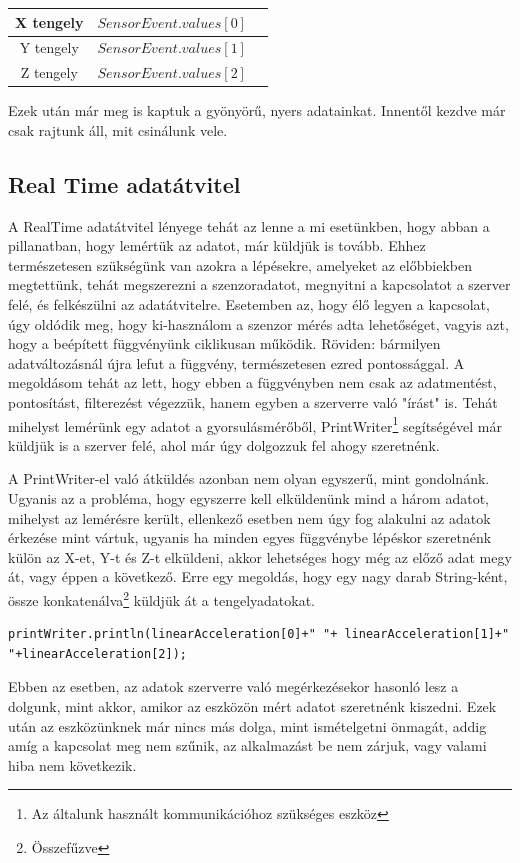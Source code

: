 \documentclass{thesis-ekf}
\theoremstyle{definition}
\theoremstyle{remark}
\begin{document}
\begin{center}
	\begin{tabular}{ |c|c|c| } 
		\hline
		X tengely & $SensorEvent.values[0]$  \\
		\hline
		Y tengely & $SensorEvent.values[1]$\\
		\hline
		Z tengely & $SensorEvent.values[2]$ \\
		\hline
	\end{tabular}
\end{center}
\par Ezek után már meg is kaptuk a gyönyörű, nyers adatainkat. Innentől kezdve már csak rajtunk áll, mit csinálunk vele.
\subsection{Real Time adatátvitel}
A RealTime adatátvitel lényege tehát az lenne a mi esetünkben, hogy abban a pillanatban, hogy lemértük az adatot, már küldjük is tovább. Ehhez természetesen szükségünk van azokra a lépésekre, amelyeket az előbbiekben megtettünk, tehát megszerezni a szenzoradatot, megnyitni a kapcsolatot a szerver felé, és felkészülni az adatátvitelre. Esetemben az, hogy élő legyen a kapcsolat, úgy oldódik meg, hogy ki-használom a szenzor mérés adta lehetőséget, vagyis azt, hogy a beépített függvényünk ciklikusan működik. Röviden: bármilyen adatváltozásnál újra lefut a függvény, természetesen ezred pontossággal. A megoldásom tehát az lett, hogy ebben a függvényben nem csak az adatmentést, pontosítást, filterezést végezzük, hanem egyben a szerverre való "írást" is. Tehát mihelyst lemérünk egy adatot a gyorsulásmérőből, PrintWriter\footnote{Az általunk használt kommunikációhoz szükséges eszköz} segítségével már küldjük is a szerver felé, ahol már úgy dolgozzuk fel ahogy szeretnénk.
\par A PrintWriter-el való átküldés azonban nem olyan egyszerű, mint gondolnánk. Ugyanis az a probléma, hogy egyszerre kell elküldenünk mind a három adatot, mihelyst az lemérésre került, ellenkező esetben nem úgy fog alakulni az adatok érkezése mint vártuk, ugyanis ha minden egyes függvénybe lépéskor szeretnénk külön az X-et, Y-t és Z-t elküldeni, akkor lehetséges hogy még az előző adat megy át, vagy éppen a következő. Erre egy megoldás, hogy egy nagy darab String-ként, össze konkatenálva\footnote{Összefűzve} küldjük át a tengelyadatokat.
\begin{lstlisting}
printWriter.println(linearAcceleration[0]+" "+ linearAcceleration[1]+" "+linearAcceleration[2]);
\end{lstlisting}
\par Ebben az esetben, az adatok szerverre való megérkezésekor hasonló lesz a dolgunk, mint akkor, amikor az eszközön mért adatot szeretnénk kiszedni. Ezek után az eszközünknek már nincs más dolga, mint ismételgetni önmagát, addig amíg a kapcsolat meg nem szűnik, az alkalmazást be nem zárjuk, vagy valami hiba nem következik.
\end{document}
